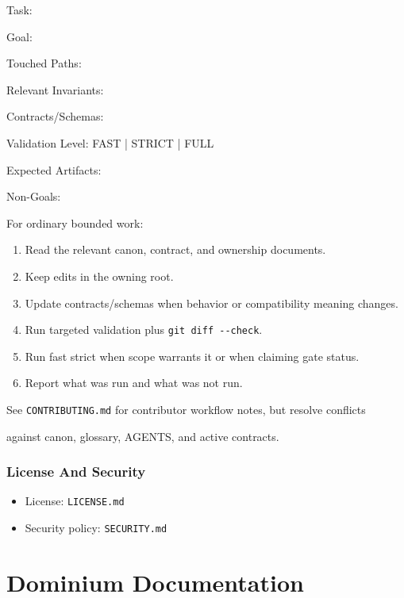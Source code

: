 \documentclass[9pt,a4paper,openany]{book}
\newcommand{\vonecode}[1]{\par\smallskip\noindent\begingroup\setlength{\fboxsep}{7pt}\colorbox{DomCodeBg}{\parbox{0.94\linewidth}{\footnotesize\ttfamily #1}}\endgroup\par\smallskip}
\begin{document}
\vonecode{Task:\par
Goal:\par
Touched Paths:\par
Relevant Invariants:\par
Contracts/\allowbreak{}Schemas:\par
Validation Level: FAST | STRICT | FULL\par
Expected Artifacts:\par
Non-\allowbreak{}Goals:\par}

For ordinary bounded work:


\begin{enumerate}
\item Read the relevant canon, contract, and ownership documents.\allowbreak{}
\item Keep edits in the owning root.\allowbreak{}
\item Update contracts/\allowbreak{}schemas when behavior or compatibility meaning changes.\allowbreak{}
\item Run targeted validation plus \texttt{git diff -\allowbreak{}-\allowbreak{}check}.\allowbreak{}
\item Run fast strict when scope warrants it or when claiming gate status.\allowbreak{}
\item Report what was run and what was not run.\allowbreak{}
\end{enumerate}

See \texttt{CONTRIBUTING.\allowbreak{}md} for contributor workflow notes, but resolve conflicts

against canon, glossary, AGENTS, and active contracts.\allowbreak{}


\subsubsection{License And Security}

\begin{itemize}
\item License: \texttt{LICENSE.\allowbreak{}md}
\item Security policy: \texttt{SECURITY.\allowbreak{}md}
\end{itemize}



\section{Dominium Documentation}
\end{document}
